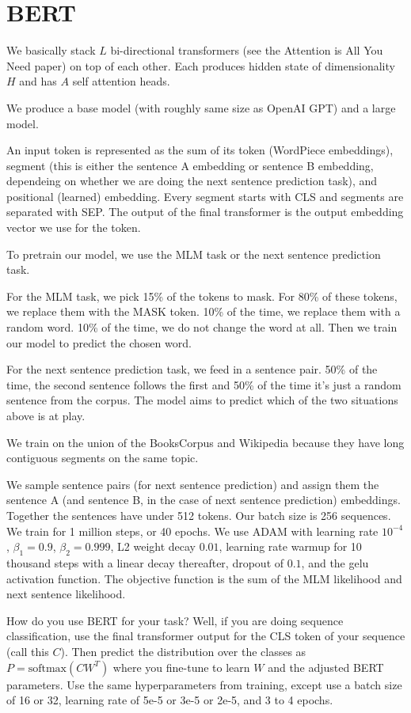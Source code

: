 \documentclass[a4paper]{article}
\begin{document}
\section{BERT}
We basically stack $L$ bi-directional transformers (see the Attention is All You
Need paper) on top of each other. Each produces hidden state of dimensionality
$H$ and has $A$ self attention heads.

We produce a base model (with roughly same size as OpenAI GPT) and a large model.

An input token is represented as the sum of its token (WordPiece embeddings),
segment (this is either the sentence A embedding or sentence B embedding,
dependeing on whether we are doing the next sentence prediction task),
and positional (learned) embedding. Every segment
starts with CLS and segments are separated with SEP. The output of the final
transformer is the output embedding vector we use for the token.

To pretrain our model, we use the MLM task or the next sentence prediction
task.

For the MLM task, we pick 15\% of the tokens to mask. For 80\% of these
tokens, we replace them with the MASK token. 10\% of the time, we replace them
with a random word. 10\% of the time, we do not change the word at all. Then
we train our model to predict the chosen word.

For the next sentence prediction task, we feed in a sentence pair. 50\% of the
time, the second sentence follows the first and 50\% of the time it's just a
random sentence from the corpus. The model aims to predict which of the two
situations above is at play.

We train on the union of the BooksCorpus and Wikipedia because they have
long contiguous segments on the same topic.

We sample sentence pairs (for next sentence prediction) and assign them
the sentence A (and sentence B, in the case of next sentence prediction)
embeddings. Together the sentences have under 512 tokens. Our batch size is 256
sequences. We train for 1 million steps, or 40 epochs. We use ADAM with
learning rate $10^{-4}$, $\beta_1 = 0.9$, $\beta_2 = 0.999$, L2 weight
decay $0.01$, learning rate warmup for 10 thousand steps with a linear
decay thereafter, dropout of $0.1$, and the gelu activation function. The objective
function is the sum of the MLM likelihood and next sentence likelihood.

How do you use BERT for your task? Well, if you are doing sequence
classification, use the final transformer output for the CLS token of your
sequence (call this $C$). Then predict the distribution over the
classes as $P = \textrm{softmax}(CW^T)$ where you fine-tune to learn $W$
and the adjusted BERT parameters. Use the same hyperparameters from training,
except use a batch size of 16 or 32, learning rate of 5e-5 or 3e-5 or 2e-5, and
3 to 4 epochs.
\end{document}
